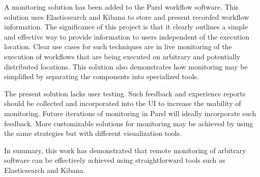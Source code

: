A monitoring solution has been added to the Parsl workflow software.
This solution uses Elasticsearch and Kibana to store and present recorded workflow information.
The significance of this project is that it clearly outlines a simple and effective way to provide information to users independent of the execution location.
Clear use cases for such techniques are in live monitoring of the execution of workflows that are being executed on arbitrary and potentially distributed locations.
This solution also demonstrates how monitoring may be simplified by separating the components into specialized tools.

The present solution lacks user testing.
Such feedback and experience reports should be collected and incorporated into the UI to increase the usability of monitoring.
Future iterations of monitoring in Parsl will ideally incorporate such feedback.
More customizable solutions for monitoring may be achieved by using the same strategies but with different visualization tools.

In summary, this work has demonstrated that remote monitoring of arbitrary software can be effectively achieved using straightforward tools such as Elasticsearch and Kibana.
